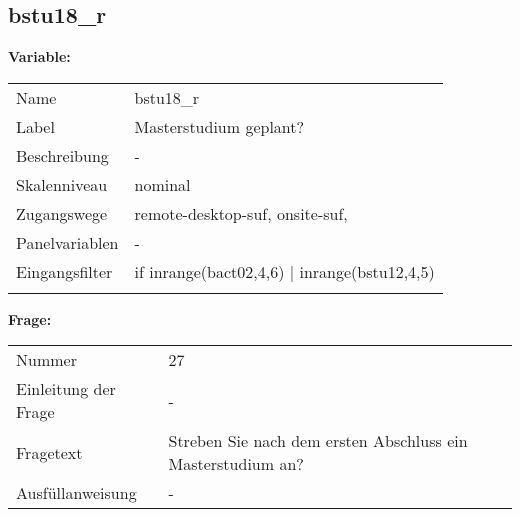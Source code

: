 	
	
	\subsection{bstu18\_r}
	\label{subSection:bstu18_r}

	\noindent\textbf{Variable:}\\
		\begin{tabular}{lL{11.3cm}}
			\label{tableVariable:bstu18_r}
			Name & bstu18\_r \\
			Label & Masterstudium geplant? \\
			Beschreibung & - \\
			Skalenniveau & nominal \\
			Zugangswege &
				remote-desktop-suf,
				onsite-suf,
 \\
			Panelvariablen & -
			 \\
			Eingangsfilter & if inrange(bact02,4,6) |  inrange(bstu12,4,5) \\
 \\
		\end{tabular}

		\vspace*{1 cm}
		\noindent\textbf{Frage:}\\
		\begin{tabular}{lL{11.3cm}}
			\label{tableQuestion:bstu18_r}
			Nummer & 27 \\
			Einleitung der Frage & - \\
			Fragetext & Streben Sie nach dem ersten Abschluss ein Masterstudium an? \\
			Ausfüllanweisung & - \\
		\end{tabular}





